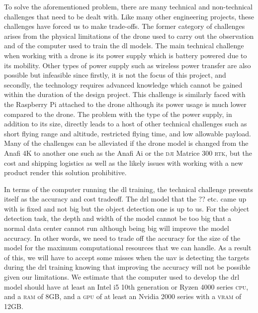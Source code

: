 \documentclass[../main.tex]{subfiles}
\begin{document}
To solve the aforementioned problem, 
there are many technical and non-technical challenges
that need to be dealt with.
Like many other engineering projects,
these challenges have forced us to make trade-offs.
The former category of challenges arises 
from the physical limitations of the drone used to
carry out the observation
and of the computer used to train the \gls{dl} models.
The main technical challenge when working with a drone
is its power supply which is battery powered due to its mobility. 
Other types of power supply such as wireless power transfer
are also possible but infeasible since firstly, it is not the
focus of this project, and secondly, the technology requires 
advanced knowledge which cannot be gained within the duration 
of the design project.
This challenge is similarly faced with the Raspberry Pi attached
to the drone although its power usage is much lower compared to the drone.
The problem with the type of the power supply, in addition to its size, 
directly leads to a host of other technical challenges
such as short flying range and altitude, restricted flying time,
and low allowable payload.
Many of the challenges can be alleviated if the drone model is changed
from the Anafi 4K to another one such as 
the Anafi Ai or the \textsc{dji} Matrice 300 \textsc{rtk},
but the cost and shipping logistics as well as
the likely issues with working with a new product
render this solution prohibitive.

In terms of the computer running the \gls{dl} training,
the technical challenge presents itself as 
the accuracy and cost tradeoff.
The \gls{drl} model that the ?? etc. came up with 
is fixed and not big
but the object detection one is up to us.
For the object detection task, 
the depth and width of the model cannot be too big that
a normal data center cannot run although 
being big will improve
the model accuracy. In other words, we need to trade off
the accuracy for the size of the model 
for the maximum computational resources that we can handle. 
As a result of this, we will have to accept some misses
when the \gls{uav} is detecting the targets during the 
\gls{drl} training knowing that improving the accuracy 
will not be possible given our limitations.
We estimate that the computer used to develop the \gls{drl} model
should have at least an Intel i5 10th generation or
Ryzen 4000 series \textsc{cpu}, and a \textsc{ram} of 8GB, 
and a \textsc{gpu} of at least an Nvidia 2000 series
with a \textsc{vram} of 12GB.
\end{document}
